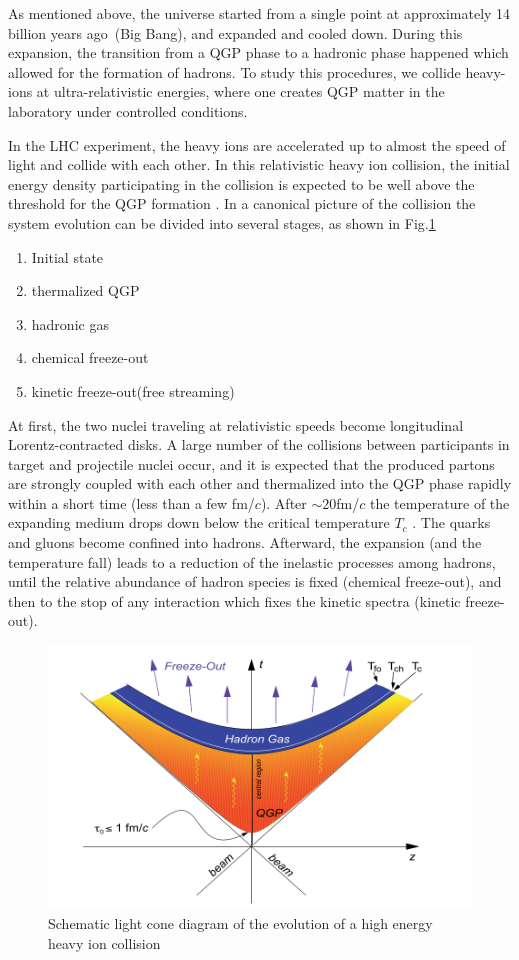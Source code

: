 As mentioned above, the universe started from a single point at approximately 14 billion years ago~(Big Bang), and expanded and cooled down. During this expansion, the transition from a QGP phase to a hadronic phase happened which allowed for the formation of hadrons.  To study this procedures, we collide heavy-ions at ultra-relativistic energies, where one creates QGP matter in the laboratory under controlled conditions. 

In the LHC experiment, the heavy ions are accelerated up to almost the speed of light and collide with each other. In this relativistic heavy ion collision, the initial energy density participating in the collision is expected to be well above the threshold for the QGP formation \cite{PhysRevD.27.140}.  In a canonical picture of the collision \cite{Kolb:2003dz} the system evolution can be divided into several stages, as shown in Fig.\ref{fig2}
  \begin{enumerate}
 	\item Initial state
 	\item thermalized QGP
 	\item hadronic gas
 	\item chemical freeze-out
 	\item kinetic freeze-out(free streaming)
 \end{enumerate}
 
 	At first, the two nuclei traveling at relativistic speeds become longitudinal Lorentz-contracted disks. A large number of the collisions between participants in target and projectile nuclei occur, and it is expected that the produced partons are strongly coupled with each other and thermalized into the QGP phase rapidly within a short time (less than a few fm/$c$). After $\sim 20$fm/$c$ the temperature of the expanding medium drops down below the critical temperature $T_c$ \cite{Rapp2011}. The quarks and gluons become confined into hadrons.  Afterward, the expansion (and the temperature fall) leads to a reduction of the inelastic processes among hadrons, until the relative abundance of hadron species is fixed (chemical freeze-out), and then to the stop of any interaction which fixes the kinetic spectra (kinetic freeze-out).
 	
 
\begin{figure}[h]
\centerline{\includegraphics[width=13.0cm]{figures/system_evol}}
\caption{Schematic light cone diagram of the evolution of a high energy
heavy ion collision}
\label{fig2}
\end{figure}

